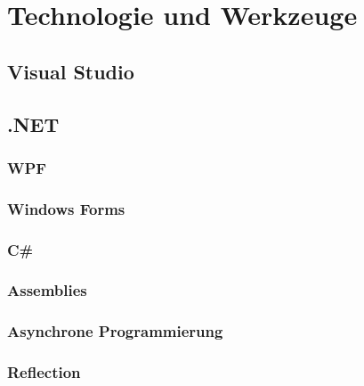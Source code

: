 \chapter{Technologie und Werkzeuge}
\label{cha:technologie_werkzeuge}

\section{Visual Studio}
\label{sec:visual_studio}

\section{.NET}
\label{sec:dotnet}

\subsection{WPF}
\label{subsec:WPF}

\subsection{Windows Forms}
\label{subsec:Winforms}

\subsection{C\#}
\label{subsec:csharp}

\subsection{Assemblies}
\label{subsec:assemblies}

\subsection{Asynchrone Programmierung}
\label{subsec:async}

\subsection{Reflection}
\label{subsec:reflection}

